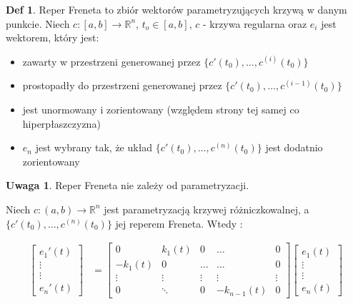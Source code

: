 \documentclass{article}
\theoremstyle{plain}
\theoremstyle{definition}
\newtheorem*{defi*}{Def}
\theoremstyle{definition}
\newtheorem*{not*}{Uwaga}
\begin{document}
\begin{defi*}
    Reper Freneta to zbiór wektorów parametryzujących krzywą w danym punkcie. Niech $c: [a, b] \to \mathbb{R}^n$, $t_o \in [a, b] $, $c$ - krzywa regularna oraz $e_i$ jest wektorem, który jest:
    \begin{itemize}
        \item zawarty w przestrzeni generowanej przez $\{ c'(t_0), \ldots, c^{(i)}(t_0) \}$
        \item prostopadły do przestrzeni generowanej przez $\{ c'(t_0), \ldots, c^{(i-1)}(t_0) \}$
        \item jest unormowany i zorientowany (względem strony tej samej co hiperpłaszczyzna)
        \item $e_n$ jest wybrany tak, że układ $\{ c'(t_0), \ldots, c^{(n)}(t_0) \}$ jest dodatnio zorientowany
    \end{itemize}
\end{defi*}

\begin{not*}
    Reper Freneta nie zależy od parametryzacji.
\end{not*}


Niech $c: (a, b) \to \mathbb{R}^n$ jest parametryzacją krzywej różniczkowalnej, a  $\{ c'(t_0), \ldots, c^{(n)}(t_0) \}$ jej reperem Freneta. Wtedy :

\begin{align*}
        \left[
           \begin{array}{c}
                e_1'(t) \\
                \vdots \\
                \vdots \\
                e_n'(t)
            \end{array}
        \right] & = \left[
           \begin{array}{ccccc}
                0 & k_1(t) & 0 & \ldots & 0 \\
                -k_1(t) & 0 & \ldots & \ldots & 0 \\
                \vdots & \vdots & \vdots & \vdots & \vdots \\
                0 & \ddots & 0 & -k_{n-1}(t) & 0
            \end{array}
        \right] \left[ \begin{array}{c}
                e_1(t) \\
                \vdots \\
                \vdots \\
                e_n(t)
            \end{array}
            \right]
\end{align*}
\end{document}
